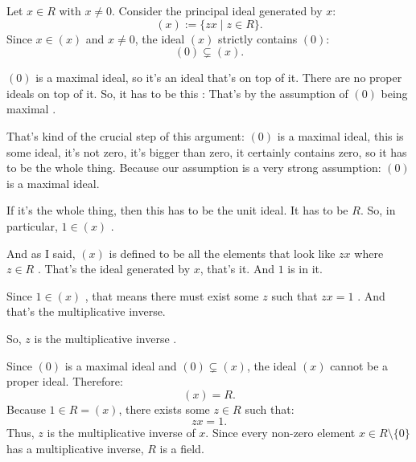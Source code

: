 \begin{content}
Let $x \in R$ with $x \neq 0$. Consider the principal ideal generated by $x$:
\begin{equation}\label{eq:principal-ideal-x}
(x) := \{ z x \mid z \in R \}.
\end{equation}
Since $x \in (x)$ and $x \neq 0$, the ideal $(x)$ strictly contains $(0)$:
\begin{equation}\label{eq:zero-strictly-in-x}
(0) \subsetneq (x).
\end{equation}
\end{content}

\begin{speech}[00:18:56 - 00:20:21]
$(0)$ is a maximal ideal, so it's an ideal that's on top of it. There are no proper ideals on top of it. So, it has to be this : That's by the assumption of $(0)$ being maximal .

That's kind of the crucial step of this argument: $(0)$ is a maximal ideal, this is some ideal, it's not zero, it's bigger than zero, it certainly contains zero, so it has to be the whole thing. Because our assumption is a very strong assumption: $(0)$ is a maximal ideal.

If it's the whole thing, then this has to be the unit ideal. It has to be $R$. So, in particular, $1 \in (x)$ .

And as I said, $(x)$ is defined to be all the elements that look like $z x$ where $z \in R$ . That's the ideal generated by $x$, that's it. And $1$ is in it.

Since $1 \in (x)$ , that means there must exist some $z$ such that $z x = 1$ . And that's the multiplicative inverse.

So, $z$ is the multiplicative inverse .
\end{speech}

\begin{content}
Since $(0)$ is a maximal ideal and $(0) \subsetneq (x)$, the ideal $(x)$ cannot be a proper ideal. Therefore:
\begin{equation}\label{eq:x-equals-r}
(x) = R.
\end{equation}
Because $1 \in R = (x)$, there exists some $z \in R$ such that:
\begin{equation}\label{eq:mult-inverse-z}
z x = 1.
\end{equation}
Thus, $z$ is the multiplicative inverse of $x$. Since every non-zero element $x \in R \setminus \{0\}$ has a multiplicative inverse, $R$ is a field.
\end{content}

